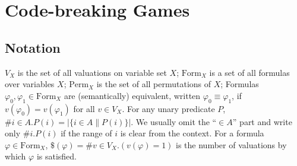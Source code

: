 \chapter{Code-breaking Games}

\newcommand{\Val}{V} %
\newcommand{\val}{v} %
\newcommand{\numval}{\$} %
\renewcommand{\Form}{\textrm{Form}} %
\newcommand{\form}{\varphi} %
\newcommand{\aform}[1]{\form_{0..#1}} %

\newcommand{\game}{\mathcal{G}}
\newcommand{\Var}{X}
\newcommand{\init}{\varphi_0}
\newcommand{\Expt}{T}
\newcommand{\expt}{t}
\newcommand{\Exp}{E}
\renewcommand{\exp}{e}
\newcommand{\param}{p}
\newcommand{\infer}{\Phi}

\newcommand{\Perm}{\textrm{Perm}}
\newcommand{\perm}{\pi}
\newcommand{\result}{\rho}

\newcommand{\stg}{\sigma}

\newcommand{\proc}{\pi}
\newcommand{\procstg}[2]{\proc_{#1,#2}}

\newcommand{\len}{\lambda}
\newcommand{\lenstg}[2]{\len^{#1,#2}}
\newcommand{\lenmax}[1]{\len^{#1}}
\newcommand{\lenexp}[1]{\len^{#1}_\textrm{exp}}

\newcommand{\exactly}[1]{\textrm{Exactly-#1}\:}
\newcommand{\atleast}[1]{\textrm{AtLeast-#1}\:}
\newcommand{\atmost}[1]{\textrm{AtMost-#1}\:}

\section[0]{Notation}
$\Val_\Var$ is the set of all valuations on variable set $\Var$;
$\Form_\Var$ is a set of all formulas over variables $\Var$;
$\Perm_\Var$ is the set of all permutations of $\Var$;
Formulas $\form_0, \form_1 \in \Form_\Var$ are (semantically) equivalent,
  written $\form_0 \equiv \form_1$, if
  $\val(\form_0) = \val(\form_1)$ for all $\val\in\Val_\Var$.
For any unary predicate $P$, $\#i\in A.P(i) = |\{ i\in A \| P(i)\}|$.
  We usually omit the ``$\in A$'' part and write only $\#i.P(i)$
  if the range of $i$ is clear from the context.
For a formula $\form\in\Form_\Var$,
  $\numval(\form) = \#\val\in\Val_\Var.(\val(\form) = 1)$
  is the number of valuations by which $\form$ is satisfied.



